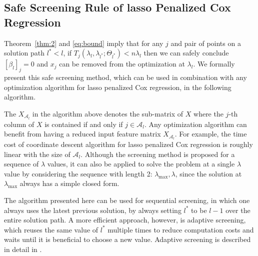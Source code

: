\subsection{Safe Screening Rule of lasso Penalized Cox Regression}

Theorem~\ref{thm:2} and \eqref{eq:bound} imply that for any $j$ and pair of points on a solution path $l^*<l$, if $T_j(\lambda_{l},\lambda_{l^*};\Theta_{l^*})<n\lambda_l$ then we can safely conclude $[\beta_l]_{j}=0$ and $x_j$ can be removed from the optimization at $\lambda_l$. We formally present this safe screening method, which can be used in combination with any optimization algorithm for lasso penalized Cox regression, in the following algorithm.

\begin{algorithm}[H]

    
\end{algorithm}

The $X_{\mathcal{A}_l}$ in the algorithm above denotes the sub-matrix of $X$ where the $j$-th column of $X$ is contained if and only if $j\in{\mathcal{A}_l}$. Any optimization algorithm can benefit from having a reduced input feature matrix $X_{\mathcal{A}_l}$. For example, the time cost of coordinate descent algorithm for lasso penalized Cox regression \citep{simon2011regularization} is roughly linear with the size of $\mathcal{A}_l$. Although the screening method is proposed for a sequence of $\lambda$ values, it can also be applied to solve the problem at a single $\lambda$ value by considering the sequence with length 2: $\lambda_{\max},\lambda$, since the solution at $\lambda_{\max}$ always has a simple closed form.

The algorithm presented here can be used for sequential screening, in which one always uses the latest previous solution, by always setting $l^*$ to be $l-1$ over the entire solution path. A more efficient approach, however, is adaptive screening, which reuses the same value of $l^*$ multiple times to reduce computation costs and waits until it is beneficial to choose a new value. Adaptive screening is described in detail in \citep{wang2021adaptive}.

